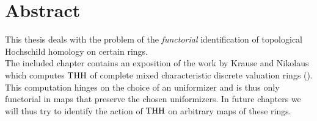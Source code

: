 \chapter*{Abstract}
This thesis deals with the problem of the \textit{functorial} identification of topological Hochschild homology on certain rings. \\
The included chapter contains an exposition of the work by Krause and Nikolaus which computes $\operatorname{THH}$ of complete mixed characteristic discrete valuation rings (\cite{KN}). This computation hinges on the choice of an uniformizer and is thus only functorial in maps that preserve the chosen uniformizers.
In future chapters we will thus try to identify the action of $\operatorname{THH}$ on arbitrary maps of these rings. 

